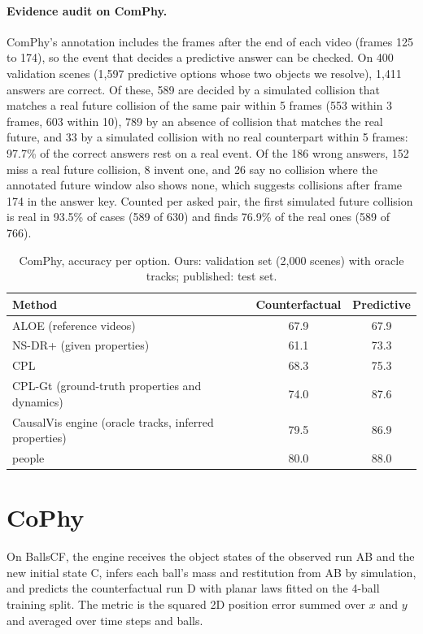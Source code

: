\documentclass[10pt,onecolumn,letterpaper]{article}
\newcommand{\sys}{CausalVis}
\begin{document}
\paragraph{Evidence audit on ComPhy.}
ComPhy's annotation includes the frames after the end of each video (frames 125 to 174), so the event that decides a predictive answer can be checked.
On 400 validation scenes (1,597 predictive options whose two objects we resolve), 1,411 answers are correct.
Of these, 589 are decided by a simulated collision that matches a real future collision of the same pair within 5 frames (553 within 3 frames, 603 within 10), 789 by an absence of collision that matches the real future, and 33 by a simulated collision with no real counterpart within 5 frames: 97.7\% of the correct answers rest on a real event.
Of the 186 wrong answers, 152 miss a real future collision, 8 invent one, and 26 say no collision where the annotated future window also shows none, which suggests collisions after frame 174 in the answer key.
Counted per asked pair, the first simulated future collision is real in 93.5\% of cases (589 of 630) and finds 76.9\% of the real ones (589 of 766).

\begin{table}[h]
\caption{ComPhy, accuracy per option. Ours: validation set (2,000 scenes) with oracle tracks; published: test set.}
\label{tab:comphy}
\centering
\small
\begin{tabular}{@{}lcc@{}}
\toprule
Method & Counterfactual & Predictive \\
\midrule
ALOE (reference videos) & 67.9 & 67.9 \\
NS-DR+ (given properties) & 61.1 & 73.3 \\
CPL & 68.3 & 75.3 \\
CPL-Gt (ground-truth properties and dynamics) & 74.0 & 87.6 \\
\sys{} engine (oracle tracks, inferred properties) & 79.5 & 86.9 \\
people & 80.0 & 88.0 \\
\bottomrule
\end{tabular}
\end{table}

\section{CoPhy}
\label{app:cophy}

On BallsCF, the engine receives the object states of the observed run AB and the new initial state C, infers each ball's mass and restitution from AB by simulation, and predicts the counterfactual run D with planar laws fitted on the 4-ball training split.
The metric is the squared 2D position error summed over $x$ and $y$ and averaged over time steps and balls.
\end{document}
